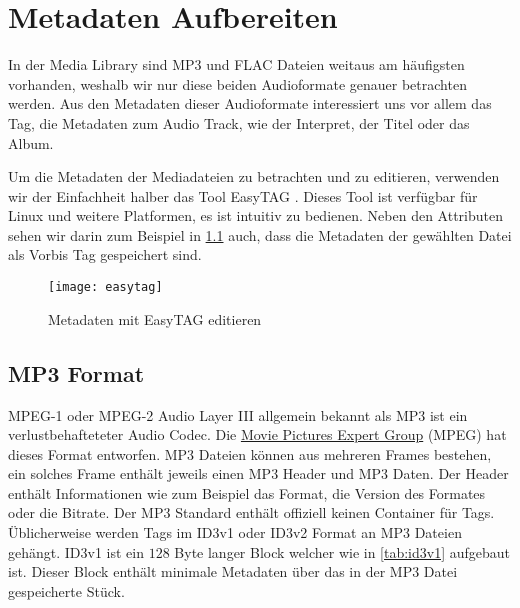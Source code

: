 \begin{comment}
Vorbereiten der Suche
\begin{itemize}
    \item Es sollen mögliche Medienformate untersucht werden.
\end{itemize}

\paragraph{Result} \hfill \\
Analyse der möglichen Medienformate und Entscheid für ein bis zwei Formate für die Indizierung.
\end{comment}


\chapter{Metadaten Aufbereiten}
\label{ch:formats}

In der Media Library sind MP3 und FLAC Dateien weitaus
am häufigsten vorhanden, weshalb wir nur diese beiden Audioformate
genauer betrachten werden. Aus den Metadaten dieser
Audioformate interessiert uns vor allem das Tag, die
Metadaten zum Audio Track, wie der Interpret, der Titel
oder das Album.

Um die Metadaten der Mediadateien zu betrachten und
zu editieren, verwenden wir der Einfachheit halber das Tool
EasyTAG \cite{web:easytag}. Dieses Tool ist verfügbar für
Linux und weitere Platformen, es ist intuitiv zu bedienen.
Neben den Attributen sehen wir darin zum Beispiel in
\cref{fig:easytag} auch, dass die Metadaten der gewählten
Datei als  Vorbis Tag gespeichert sind.

\begin{figure}[ht]
    \centering
    \texttt{[image: easytag]}
    \caption{Metadaten mit EasyTAG editieren}
    \label{fig:easytag}
\end{figure}

\section{MP3 Format}
MPEG-1 oder MPEG-2 Audio Layer {III} allgemein bekannt als MP3
ist ein verlustbehafteteter Audio Codec. Die
\href{http://mpeg.chiariglione.org/}{Movie Pictures Expert Group}
(MPEG) hat dieses Format entworfen.
MP3 Dateien können aus mehreren Frames bestehen, ein
solches Frame enthält jeweils einen MP3 Header und MP3 Daten.
Der Header enthält Informationen wie zum Beispiel das Format,
die Version des Formates oder die Bitrate. Der MP3 Standard
enthält offiziell keinen Container für Tags. Üblicherweise werden
Tags im ID3v1 oder ID3v2 Format an MP3 Dateien gehängt.
ID3v1 ist ein \(128\) Byte langer Block welcher wie in 
\cref{tab:id3v1}
aufgebaut ist. Dieser Block enthält minimale Metadaten
über das in der MP3 Datei gespeicherte Stück.

